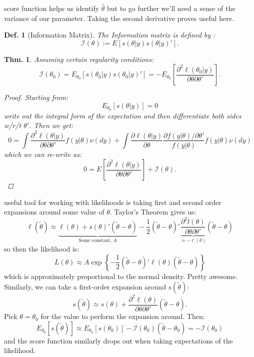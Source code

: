 \documentclass{tufte-book}
\theoremstyle{mytheoremstyle}
\newtheorem*{thm}{Thm.}
\theoremstyle{mylemstyle}
\theoremstyle{mydefstyle}
\newtheorem*{mydef}{Def.}
\begin{document}
 score function helps us identify \(\hat{\theta}\) but to go further we'll need a sense of the variance of our parameter. Taking the second derivative proves useful here.
\begin{mydef}[Information Matrix] The Information matrix is defined by : 
	\[\mathcal{I}(\theta) := E[s(\theta| y) s(\theta | y)'] \text{.}\]
\end{mydef}
\begin{thm} Assuming certain regularity conditions:
	\[\mathcal{I}(\theta_0) = E_{\theta_0} [s(\theta_0 | y) s(\theta_0 | y)'] = - E_{\theta_0} \left[ \frac{ \partial^2 \ell(\theta_0 | y) }{\partial \theta \partial \theta'} \right] \text{.}\]
\begin{proof}
	Starting from:
		\[E_{\theta_0} [s(\theta | y) ] = 0\]
	write out the integral form of the expectation and then differentiate both sides w/r/t \(\theta'\). Then we get:
		\[0 = \int \frac{\partial^2 \ell (\theta| y)}{\partial \theta \partial \theta'} f(y | \theta) \nu(dy) + \int \frac{\partial \ell(\theta | y)}{\partial \theta} \frac{\partial f(y | \theta)/\partial \theta'}{f(y | \theta)} f(y| \theta) \nu(dy)\]
	which we can re-write as:
		\[0 = E\left[\frac{\partial^2 \ell(\theta | y)}{\partial \theta \partial \theta'} \right] + \mathcal{I}(\theta) \text{.}\]
\end{proof}
\end{thm}
 useful tool for working with likelihoods is taking first and second order expansions around some value of \(\theta\). Taylor's Theorem gives us:
	\[\ell (\tilde{\theta}) \approx \underbrace{\ell(\theta) + s(\theta)'(\tilde{\theta} - \theta)}_\textrm{Some constant, \(A\)} - \frac{1}{2}(\tilde{\theta} - \theta)' \underbrace{\frac{\partial^2 l(\theta)}{\partial \theta \partial \theta'}}_\textrm{\(\approx -\ell(\theta)\)}(\tilde{\theta} - \theta)\]
so then the likelihood is:
	\[L(\theta) \approx A \exp\left\{ -\frac{1}{2}(\tilde{\theta} - \theta)' \ell(\theta)(\tilde{\theta} - \theta) \right\}\]
which is approximately proportional to the normal density. Pretty awesome. Similarly, we can take a first-order expansion around \(s(\tilde{\theta})\):
	\[s(\tilde{\theta}) \approx s(\theta) + \frac{\partial^2 \ell(\theta)}{\partial \theta \partial \theta' }(\tilde{\theta} - \theta) \text{.}\]
Pick \(\theta = \theta_0\) for the value to perform the expansion around. Then:
	\[E_{\theta_0}[s(\tilde{\theta})] \approx E_{\theta_0}[s(\theta_0)] - \mathcal{I}(\theta_0) (\tilde{\theta} - \theta_0) = -\mathcal{I}(\theta_0)\]
and the score function similarly drops out when taking expectations of the likelihood. 
\end{document}
